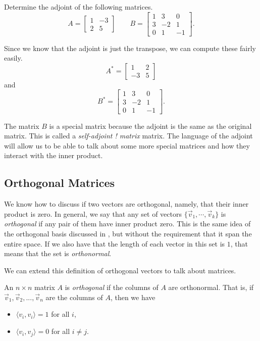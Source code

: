 \begin{example}
Determine the adjoint of the following matrices.
\[ A = \begin{bmatrix}1 & -3 \\ 2 & 5 \end{bmatrix} \qquad B = \begin{bmatrix} 1 & 3 & 0 \\ 3 & -2 & 1 \\ 0 & 1 & -1 \end{bmatrix}. \]
\end{example}

\begin{exampleSol}
Since we know that the adjoint is just the transpose, we can compute these fairly easily.
\[ A^* = \begin{bmatrix} 1 & 2 \\ -3 & 5 \end{bmatrix} \] and
\[ B^* = \begin{bmatrix} 1 & 3 & 0 \\ 3 & -2 & 1 \\ 0 & 1 & -1 \end{bmatrix}. \]
\end{exampleSol}

The matrix $B$ is a special matrix because the adjoint is the same as the original matrix. This is called a \emph{self-adjoint ! matrix} matrix. The language of the adjoint will allow us to be able to talk about some more special matrices and how they interact with the inner product.


\subsection{Orthogonal Matrices}

We know how to discuss if two vectors are orthogonal, namely, that their inner product is zero. In general, we say that any set of vectors $\{\vec{v}_1, \cdots, \vec{v}_k\}$ is \emph{orthogonal} if any pair of them have inner product zero. This is the same idea of the orthogonal basis discussed in , but without the requirement that it span the entire space. If we also have that the length of each vector in this set is $1$, that means that the set is \emph{orthonormal}. 

We can extend this definition of orthogonal vectors to talk about matrices. 

\begin{definition}
An $n\times n$ matrix $A$ is \emph{orthogonal} if the columns of $A$ are orthonormal. That is, if $\vec{v}_1, \vec{v}_2, ..., \vec{v}_n$ are the columns of $A$, then we have
\begin{itemize}
\item $\langle v_i, v_i \rangle = 1$ for all $i$,
\item $\langle v_i, v_j \rangle = 0$ for all $i \neq j$. 
\end{itemize}
\end{definition}

